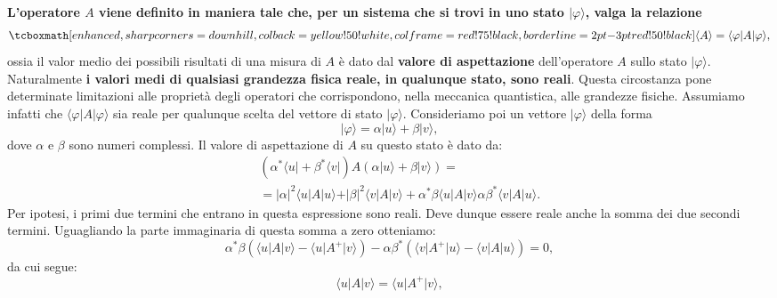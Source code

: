 \documentclass[a4paper,12pt,oneside]{book}
\begin{document}
\textbf{L'operatore $A$ viene definito in maniera tale che, per un sistema che si trovi in uno stato $\vert \varphi \rangle $, valga la relazione}
	\begin{equation}
		\tcboxmath[enhanced,sharp corners=downhill ,colback=yellow!50!white,colframe=red!75!black, borderline={2pt}{-3pt}{red!50!black}]{
			\langle A \rangle = \langle \varphi \vert A \vert \varphi \rangle,
			}
	\end{equation}
ossia il valor medio dei possibili risultati di una misura di $A$ è dato dal \textbf{valore di aspettazione} dell'operatore $A$ sullo stato $\vert \varphi \rangle$.\\

Naturalmente \textbf{i valori medi di qualsiasi grandezza fisica reale, in qualunque stato, sono reali}. Questa circostanza pone determinate limitazioni alle proprietà degli operatori che corrispondono, nella meccanica quantistica, alle grandezze fisiche. Assumiamo infatti che $\langle \varphi \vert A \vert \varphi \rangle$ sia reale per qualunque scelta del vettore di stato $\vert \varphi \rangle$. Consideriamo poi un vettore $\vert \varphi \rangle$ della forma
	\begin{equation}
		\vert \varphi \rangle = \alpha \vert u \rangle + \beta \vert v \rangle,
	\end{equation}
dove $\alpha$ e $\beta$ sono numeri complessi. Il valore di aspettazione di $A$ su questo stato è dato da:
	\begin{eqnarray}
		& &\left( \alpha ^* \langle u \vert + \beta ^* \langle v \vert \right) A \left(\alpha \vert u \rangle + \beta \vert v \rangle \right) = \nonumber \\
		& &=\vert \alpha \vert ^2 \langle u \vert A \vert u \rangle + \vert \beta \vert ^2 \langle v \vert A \vert v \rangle + \alpha ^* \beta \langle u \vert A \vert v \rangle \alpha  \beta ^* \langle v \vert A \vert u \rangle.
	\end{eqnarray}
Per ipotesi, i primi due termini che entrano in questa espressione sono reali. Deve dunque essere reale anche la somma dei due secondi termini. Uguagliando la parte immaginaria di questa somma a zero otteniamo:
	\begin{equation}
		\label{eq:cap4_1}
		\alpha ^* \beta \left(\langle u \vert A \vert v \rangle -\langle u \vert A^{+} \vert v \rangle \right)-  \alpha  \beta ^* \left( \langle v \vert A^{+} \vert u \rangle -\langle v \vert A \vert u \rangle \right) =0, 
	\end{equation}
da cui segue:
	\begin{equation}
		\langle u \vert A \vert v \rangle = \langle u \vert A^{+} \vert v \rangle ,
	\end{equation}
\end{document}
